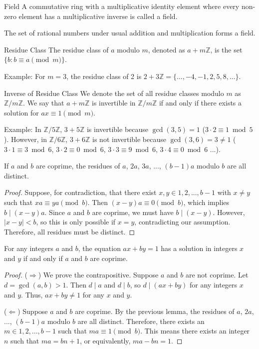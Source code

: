 \documentclass{article}
\begin{document}
\begin{definition}{Field}{}
A commutative ring with a multiplicative identity element where every non-zero element has a multiplicative inverse is called a field.
\end{definition}

The set of rational numbers under usual addition and multiplication forms a field.

\begin{definition}{Residue Class}{}
The residue class of $a$ modulo $m$, denoted as $a + m\mathbb{Z}$, is the set $\{b : b \equiv a \pmod{m}\}$.
\end{definition}

Example: For $m = 3$, the residue class of 2 is $2 + 3\mathbb{Z} = \{\ldots, -4, -1, 2, 5, 8, \ldots\}$.

\begin{definition}{Inverse of Residue Class}{}
We denote the set of all residue classes modulo $m$ as $\mathbb{Z} / m\mathbb{Z}$. We say that $a + m\mathbb{Z}$ is invertible in $\mathbb{Z} / m\mathbb{Z}$ if and only if there exists a solution for $ax \equiv 1 \pmod{m}$.
\end{definition}

Example: In $\mathbb{Z}/5\mathbb{Z}$, $3 + 5\mathbb{Z}$ is invertible because $\gcd(3, 5) = 1$ ($3\cdot2 \equiv 1 \bmod 5$). However, in $\mathbb{Z}/6\mathbb{Z}$, $3 + 6\mathbb{Z}$ is not invertible because $\gcd(3, 6) = 3 \neq 1$ ($3 \cdot 1 \equiv 3 \bmod 6$, $3 \cdot 2 \equiv 0 \bmod 6$, $3 \cdot 3 \equiv 9 \bmod 6$, $3 \cdot 4 \equiv 0 \bmod 6$ ...).

\begin{lemma}{}{}
If $a$ and $b$ are coprime, the residues of $a$, $2a$, $3a$, ..., $(b-1)a$ modulo $b$ are all distinct.
\end{lemma}
\begin{proof}
Suppose, for contradiction, that there exist $x, y \in {1, 2, ..., b-1}$ with $x \neq y$ such that $xa \equiv ya \pmod{b}$. Then $(x-y)a \equiv 0 \pmod{b}$, which implies $b \mid (x-y)a$. Since $a$ and $b$ are coprime, we must have $b \mid (x-y)$. However, $|x-y| < b$, so this is only possible if $x = y$, contradicting our assumption. Therefore, all residues must be distinct.
\end{proof}

\begin{theorem}{}{}
For any integers $a$ and $b$, the equation $ax + by = 1$ has a solution in integers $x$ and $y$ if and only if $a$ and $b$ are coprime.
\end{theorem}
\begin{proof}
($\Rightarrow$) We prove the contrapositive. Suppose $a$ and $b$ are not coprime. Let $d = \gcd(a,b) > 1$. Then $d \mid a$ and $d \mid b$, so $d \mid (ax + by)$ for any integers $x$ and $y$. Thus, $ax + by \neq 1$ for any $x$ and $y$.

($\Leftarrow$) Suppose $a$ and $b$ are coprime. By the previous lemma, the residues of $a$, $2a$, ..., $(b-1)a$ modulo $b$ are all distinct. Therefore, there exists an $m \in {1, 2, ..., b-1}$ such that $ma \equiv 1 \pmod{b}$. This means there exists an integer $n$ such that $ma = bn + 1$, or equivalently, $ma - bn = 1$.
\end{proof}
\end{document}
